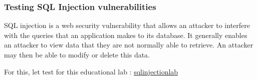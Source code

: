 \documentclass[
	a4paper, %
	12pt, %
]{CSSullivanBusinessReport}
\begin{document}
\begin{fullwidth}
\begin{fullwidth}
\end{fullwidth}
\subsubsection*{Testing SQL Injection vulnerabilities}
SQL injection is a web security vulnerability that allows an attacker to interfere with the queries that an application makes to its database. It generally enables an attacker to view data that they are not normally able to retrieve. An attacker may then be able to modify or delete this data. \newline

For this, let test for this educational lab : \href{https://portswigger.net/web-security/sql-injection/lab-retrieve-hidden-data}{\color{orange}sql\textunderscore injection\textunderscore lab}


\end{fullwidth}
\end{document}
